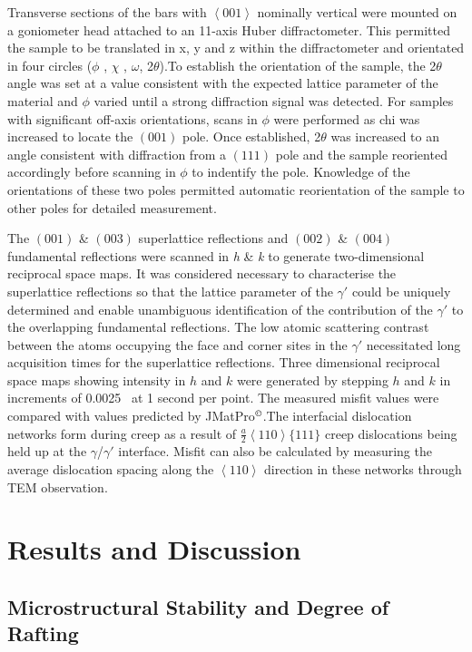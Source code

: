Transverse sections of the bars with $\left<001\right>$ nominally vertical were mounted on a goniometer head attached to an 11-axis Huber diffractometer.  This permitted the sample to be translated in x, y and z within the diffractometer and orientated in four circles ($\phi$ , $\chi$ , $\omega$, 2$\theta$).To establish the orientation of the sample, the 2$\theta$ angle was set at a value consistent with the expected lattice parameter of the material and $\phi$ varied until a strong diffraction signal was detected.  For samples with significant off-axis orientations, scans in $\phi$ were performed as chi was increased to locate the $\left(001\right)$ pole.  Once established, 2$\theta$ was increased to an angle consistent with diffraction from a $\left(111\right)$ pole and the sample reoriented accordingly before scanning in $\phi$ to indentify the pole.  Knowledge of the orientations of these two poles permitted automatic reorientation of the sample to other poles for detailed measurement.

The $\left(001\right)$ \& $\left(003\right)$ superlattice reflections and $\left(002\right)$ \& $\left(004\right)$ fundamental reflections were scanned in \emph{h} \& \emph{k} to generate two-dimensional reciprocal space maps.  It was considered necessary to characterise the superlattice reflections so that the lattice parameter of the $\gamma'$ could be uniquely determined and enable unambiguous identification of the contribution of the $\gamma'$ to the overlapping fundamental reflections.  The low atomic scattering contrast between the atoms occupying the face and corner sites in the $\gamma'$ necessitated long acquisition times for the superlattice reflections.  Three dimensional reciprocal space maps showing intensity in $h$ and $k$ were generated by stepping $h$ and $k$ in increments of 0.0025 \angstrom\ at 1 second per point.  The measured misfit values were compared with values predicted by JMatPro$^{\copyright}$.The interfacial dislocation networks form during creep as a result of $\frac{a}{2}\left<110\right>\{111\}$ creep dislocations being held up at the $\gamma$/$\gamma'$ interface. Misfit can also be calculated by measuring the average dislocation spacing along the $\left<110\right>$ direction in these networks through TEM observation.

\section{Results and Discussion}

\subsection{Microstructural Stability and Degree of Rafting}

